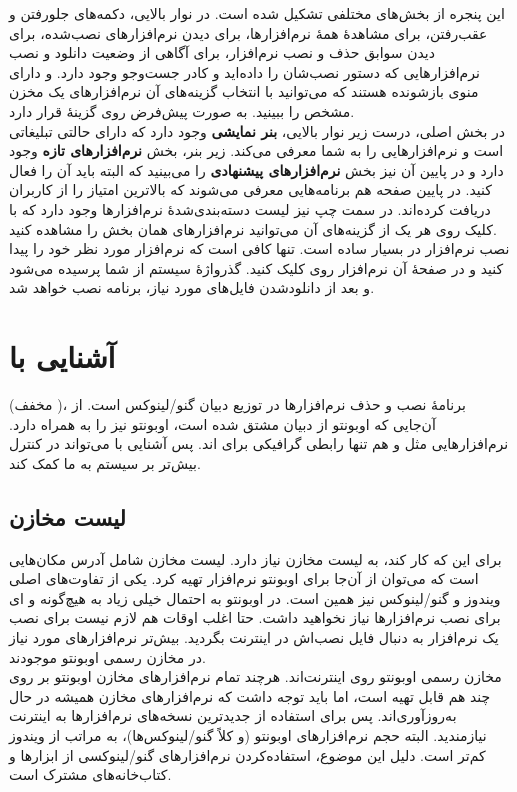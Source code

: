 این پنجره از بخش‌های مختلفی تشکیل شده است. در نوار بالایی، دکمه‌های جلورفتن و عقب‌رفتن،  برای مشاهدهٔ همهٔ نرم‌افزارها،  برای دیدن نرم‌افزارهای نصب‌شده،  برای دیدن سوابق حذف و نصب نرم‌افزار،  برای آگاهی از وضعیت دانلود و نصب نرم‌افزارهایی که دستور نصب‌شان را داده‌اید و کادر جست‌وجو وجود دارد.  و  دارای منوی بازشونده هستند که می‌توانید با انتخاب گزینه‌های آن نرم‌افزارهای یک مخزن مشخص را ببینید.  به صورت پیش‌فرض روی گزینهٔ  قرار دارد.\\
در بخش اصلی، درست زیر نوار بالایی، \textbf{بنر نمایشی} وجود دارد که دارای حالتی تبلیغاتی است و نرم‌افزارهایی را به شما معرفی می‌کند. زیر بنر، بخش \textbf{نرم‌افزارهای تازه} وجود دارد و در پایین آن نیز بخش \textbf{نرم‌افزارهای پیشنهادی} را می‌بینید که البته باید آن را فعال کنید. در پایین صفحه هم برنامه‌هایی معرفی می‌شوند که بالاترین امتیاز را از کاربران دریافت کرده‌اند. در سمت چپ نیز لیست دسته‌بندی‌شدهٔ نرم‌افزارها وجود دارد که با کلیک روی هر یک از گزینه‌های آن می‌توانید نرم‌افزارهای همان بخش را مشاهده کنید.\\
نصب نرم‌افزار در  بسیار ساده است. تنها کافی است که نرم‌افزار مورد نظر خود را پیدا کنید و در صفحهٔ آن نرم‌افزار روی  کلیک کنید. گذرواژهٔ سیستم از شما پرسیده می‌شود و بعد از دانلودشدن فایل‌های مورد نیاز، برنامه نصب خواهد شد.

\section[آشنایی با Apt]{آشنایی با }
 (مخفف )، برنامهٔ نصب و حذف نرم‌افزارها در توزیع دبیان گنو/لینوکس است. از آن‌جایی که اوبونتو از دبیان مشتق شده است، اوبونتو نیز  را به همراه دارد. نرم‌افزارهایی مثل  و  هم تنها رابطی گرافیکی برای  اند. پس آشنایی با  می‌تواند در کنترل بیش‌تر بر سیستم به ما کمک کند.

\subsection{لیست مخازن}
برای این که  کار کند، به لیست مخازن نیاز دارد. لیست مخازن شامل آدرس مکان‌هایی است که می‌توان از آن‌جا برای اوبونتو نرم‌افزار تهیه کرد. یکی از تفاوت‌های اصلی ویندوز و گنو/لینوکس نیز همین است. در اوبونتو به احتمال خیلی زیاد به هیچ‌گونه  و ای برای نصب نرم‌افزارها نیاز نخواهید داشت. حتا اغلب اوقات هم لازم نیست برای نصب یک نرم‌افزار به دنبال فایل نصب‌اش در اینترنت بگردید. بیش‌تر نرم‌افزارهای مورد نیاز در مخازن رسمی اوبونتو موجودند.\\
مخازن رسمی اوبونتو روی اینترنت‌اند. هرچند تمام نرم‌افزارهای مخازن اوبونتو بر روی چند  هم قابل تهیه است، اما باید توجه داشت که نرم‌افزارهای مخازن همیشه در حال به‌روزآوری‌اند. پس برای استفاده از جدیدترین نسخه‌های نرم‌افزارها به اینترنت نیازمندید. البته حجم نرم‌افزارهای اوبونتو (و کلاً گنو/لینوکس‌ها)، به مراتب از ویندوز کم‌تر است. دلیل این موضوع، استفاده‌کردن نرم‌افزارهای گنو/لینوکسی از ابزارها و کتاب‌خانه‌های مشترک است.\\
